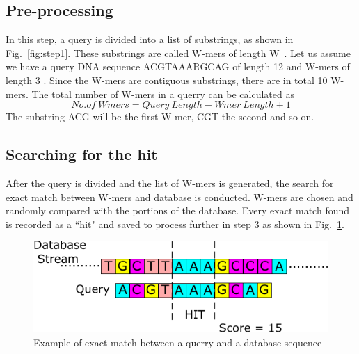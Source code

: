 \subsection{Pre-processing}
In this step, a query is divided into a list of substrings, as shown in Fig.~\ref{fig:step1}. 
These substrings are called W-mers of length W~\cite{sotiriades2007design}. 
Let us assume we have a query DNA sequence ACGTAAARGCAG of length 12 and W-mers of length 3 \cite{sotiriades2007design}. 
Since the W-mers are contiguous substrings, there are in total 10 W-mers. 
The total number of W-mers in a querry can be calculated as 
\begin{equation}
\label{eq1}
No.of \ Wmers = Query \ Length - Wmer \ Length + 1 
\end{equation}
The substring ACG will be the first W-mer, CGT the second and so on. 



\subsection{Searching for the hit}
After the query is divided and the list of W-mers is generated, the search for exact match between W-mers and database is conducted.
W-mers are chosen and randomly compared with the portions of the database. 
Every exact match found is recorded as a ``hit" and saved to process further in step 3 as shown in Fig.~\ref{fig:step2}. 

\begin{figure}[t!]
\centering
\includegraphics[width=\columnwidth]{Figures/Algorithm2.pdf}
\caption{Example of exact match between a querry and a database sequence} \label{fig:step2}
\end{figure}



